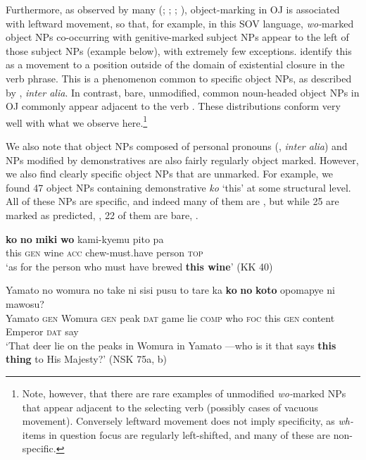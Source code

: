 \documentclass[output=paper]{LSP/langsci}
\begin{document}
Furthermore, as observed by many (\citealt{Matsuo1944Kyakugo};
\citealt[48]{Matsunaga1983Japanese}; \citealt{Miyagawa1989Structure};
\citealt{Yanagida2006Word}), object-marking in OJ  is associated with
leftward movement, so that, for example, in this SOV language,
\textit{wo-}marked object NPs co-occurring with genitive-marked
subject NPs appear to the left of those subject NPs (\eg example
 below), with extremely few
exceptions. \citet{Yanagidaetal2009Word} identify this as a movement
to a position outside of the domain of existential closure in the verb
phrase. This is a phenomenon common to specific object NPs, as
described by \citet{Diesing1992Indefinites}, \textit{inter alia}. In
contrast, bare, unmodified, common noun-headed object NPs in OJ  
commonly appear adjacent to the verb
\citep{Yanagida2006Word,Yanagidaetal2009Word}. These distributions
conform very well with what we observe here.\footnote{Note, however,
 that there are rare examples of unmodified \textit{wo-}marked NPs
 that appear adjacent to the selecting verb (possibly cases of
 vacuous movement). Conversely leftward movement does not imply
 specificity, as \textit{wh-}items in question focus are regularly
 left-shifted, and many of these are non-specific.}

 \largerpage
We also note that object NPs composed of personal pronouns
(\citealt{Wronaetal2010Japanese}, \textit{inter alia}) and NPs
modified by demonstratives are also fairly regularly object
marked. However, we also find clearly specific object NPs that are
unmarked. For example, we found 47 object NPs containing demonstrative
\textit{ko} ‘this’ at some structural level. All of these NPs are
specific, and indeed many of them are , but while 25 are
 marked as predicted, \eg {}, 22 of them are bare,
\eg {}.

\begin{exe}
\ex \label{07-fr-ex:4}%
\gll \textbf{ko} \textbf{no} \textbf{miki} \textbf{wo} kami-kyemu pito pa\\
this \textsc{gen} wine \textsc{acc} chew-must.have person \textsc{top}\\
\glt ‘as for the person who must have brewed \textbf{this wine}’  (KK 40)
\end{exe}

\begin{exe}
\ex \label{07-fr-ex:5}%
\gll Yamato no womura no take ni sisi pusu to tare ka \textbf{ko} \textbf{no} \textbf{koto} opomapye ni mawosu?\\
 Yamato \textsc{gen} Womura \textsc{gen} peak \textsc{dat} game lie \textsc{comp} who \textsc{foc} this \textsc{gen} content Emperor \textsc{dat} say\\
\glt ‘That deer lie on the peaks in Womura in Yamato ---who is it that says \textbf{this thing} to His Majesty?’ (NSK 75a, b)
\end{exe}
\end{document}
